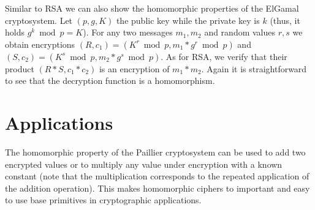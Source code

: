 Similar to RSA we can also show the homomorphic properties of the ElGamal cryptosystem. Let $(p,g,K)$ the public key while the private key is $k$ (thus, it holds $g^k \bmod p = K$). For any two messages $m_1, m_2$ and random values $r, s$ we obtain encryptions $(R, c_1) = (K^r \bmod p, m_1*g^r \bmod p)$ and $(S,c_2) = (K^s \bmod p, m_2 * g^s \bmod p)$. As for RSA, we verify that their product $(R*S, c_1*c_2)$ is an encryption of $m_1*m_2$. Again it is straightforward to see that the decryption function is a homomorphism.

\section{Applications}
The homomorphic property of the Paillier cryptosystem can be used to add two encrypted values or to multiply any value under encryption with a known constant (note that the multiplication corresponds to the repeated application of the addition operation). This makes homomorphic ciphers to important and easy to use base primitives in cryptographic applications.

